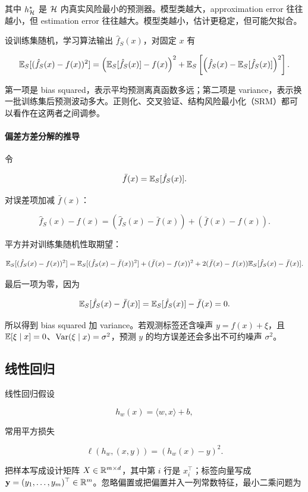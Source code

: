 \documentclass[11pt]{ctexart}
\begin{document}
其中 \(h^*_{\mathcal{H}}\) 是 \(\mathcal{H}\) 内真实风险最小的预测器。模型类越大，approximation error 往往越小，但 estimation error 往往越大。模型类越小，估计更稳定，但可能欠拟合。

\begin{definition}
设训练集随机，学习算法输出 \(\hat f_S(x)\)，对固定 \(x\) 有

\[
  \mathbb{E}_S[(\hat f_S(x)-f(x))^2]
  =
  \left(\mathbb{E}_S[\hat f_S(x)]-f(x)\right)^2
  +
  \mathbb{E}_S\left[
    \left(\hat f_S(x)-\mathbb{E}_S[\hat f_S(x)]\right)^2
  \right].
\]
\end{definition}

第一项是 bias squared，表示平均预测离真函数多远；第二项是 variance，表示换一批训练集后预测波动多大。正则化、交叉验证、结构风险最小化（SRM）都可以看作在这两者之间调参。

\paragraph{偏差方差分解的推导}

令

\[
  \bar f(x)=\mathbb{E}_S[\hat f_S(x)].
\]

对误差项加减 \(\bar f(x)\)：

\[
  \hat f_S(x)-f(x)
  =
  \left(\hat f_S(x)-\bar f(x)\right)
  +
  \left(\bar f(x)-f(x)\right).
\]

平方并对训练集随机性取期望：

\[
  \mathbb{E}_S[(\hat f_S(x)-f(x))^2]
  =
  \mathbb{E}_S[(\hat f_S(x)-\bar f(x))^2]
  +
  (\bar f(x)-f(x))^2
  +
  2(\bar f(x)-f(x))
  \mathbb{E}_S[\hat f_S(x)-\bar f(x)].
\]

最后一项为零，因为

\[
  \mathbb{E}_S[\hat f_S(x)-\bar f(x)]
  =
  \mathbb{E}_S[\hat f_S(x)]-\bar f(x)
  =
  0.
\]

所以得到 bias squared 加 variance。若观测标签还含噪声 \(y=f(x)+\xi\)，且 \(\mathbb{E}[\xi\mid x]=0\)、\(\operatorname{Var}(\xi\mid x)=\sigma^2\)，预测 \(y\) 的均方误差还会多出不可约噪声 \(\sigma^2\)。

\subsection{线性回归}

线性回归假设

\[
  h_w(x)=\langle w,x\rangle+b,
\]

常用平方损失

\[
  \ell(h_w,(x,y))=(h_w(x)-y)^2.
\]

把样本写成设计矩阵 \(X\in\mathbb{R}^{m\times d}\)，其中第 \(i\) 行是 \(x_i^\top\)；标签向量写成 \(\mathbf{y}=(y_1,\ldots,y_m)^\top\in\mathbb{R}^m\)。忽略偏置或把偏置并入一列常数特征，最小二乘问题为
\end{document}
